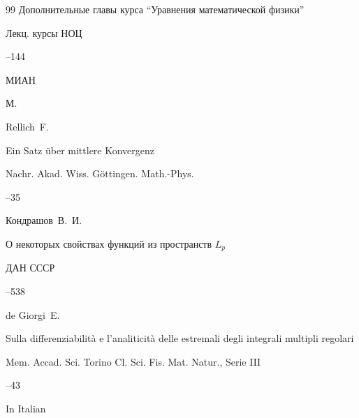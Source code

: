 \begin{thebibliography}{99}
\paper Дополнительные главы курса ``Уравнения математической физики''

\serial Лекц. курсы НОЦ



--144

\publ МИАН

\publaddr М.







\by Rellich~F.

\paper Ein Satz \"uber mittlere Konvergenz

\jour Nachr. Akad. Wiss. G\"ottingen. Math.-Phys.



--35





\by Кондрашов~В.~И.

\paper О некоторых свойствах функций из пространств $L_p$

\jour ДАН СССР



--538





\by de Giorgi~E.

\paper Sulla differenziabilit\`a e l'analiticit\`a delle estremali degli integrali multipli regolari

\jour Mem. Accad. Sci. Torino Cl. Sci. Fis. Mat. Natur.\rm, Serie III



--43

\lang In Italian




\end{thebibliography}
